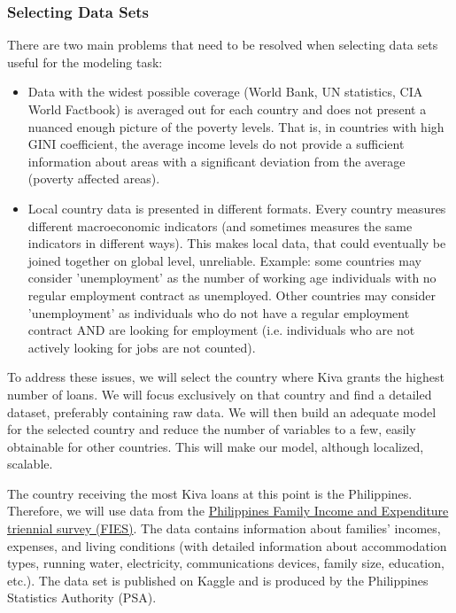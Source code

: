 \documentclass{article}
\begin{document}
\subsubsection{Selecting Data Sets}
There are two main problems that need to be resolved when selecting data sets useful for the modeling task:
\begin{itemize}
  \item Data with the widest possible coverage (World Bank, UN statistics, CIA World Factbook) is averaged out for each country and does not present a nuanced enough picture of the poverty levels. That is, in countries with high GINI coefficient, the average income levels do not provide a sufficient information about areas with a significant deviation from the average (poverty affected areas).
  \item Local country data is presented in different formats. Every country measures different macroeconomic indicators (and sometimes measures the same indicators in different ways). This makes local data, that could eventually be joined together on global level, unreliable. Example: some countries may consider 'unemployment' as the number of working age individuals with no regular employment contract as unemployed. Other countries may consider 'unemployment' as individuals who do not have a regular employment contract AND are looking for employment (i.e. individuals who are not actively looking for jobs are not counted).
\end{itemize}

To address these issues, we will select the country where Kiva grants the highest number of loans. We will focus exclusively on that country and find a detailed dataset, preferably containing raw data. We will then build an adequate model for the selected country and reduce the number of variables to a few, easily obtainable for other countries. This will make our model, although localized, scalable.

The country receiving the most Kiva loans at this point is the Philippines. Therefore, we will use data from the \href{https://www.kaggle.com/grosvenpaul/family-income-and-expenditure}{Philippines Family Income and Expenditure triennial survey (FIES)}. The data contains information about families’ incomes, expenses, and living conditions (with detailed information about accommodation types, running water, electricity, communications devices, family size, education, etc.). The data set is published on Kaggle and is produced by the Philippines Statistics Authority (PSA).
\end{document}

